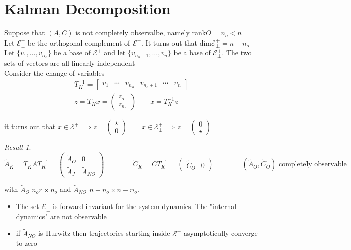 \documentclass{book}
\theoremstyle{definition}
\theoremstyle{remark}
\theoremstyle{remark}
\newtheorem*{result}{Result}
\begin{document}
\section{Kalman Decomposition}

Suppose that $(A,C)$ is not completely observalbe, namely rank$O=n_o<n$\\
Let $\mathcal{E}^+_{\perp}$ be the orthogonal complement of $\mathcal{E}^+$. It turns out that dim$\mathcal{E}^+_{\perp}=n-n_o$ \\
Let $\{v_1,\dots,v_{n_o}\}$ be a base of $\mathcal{E}^+$ and let $\{v_{n_o+1},\dots,v_n\}$ be a base of $\mathcal{E}^+_{\perp}$. The two sets of vectors are all linearly independent\\
Consider the change of variables \begin{gather*}
    T_K^{-1}=\begin{bmatrix}
    v_1 &  \cdots & v_{n_o} & v_{n_o+1} & \cdots & v_n
\end{bmatrix}\\
z=T_Kx=\begin{pmatrix}
    z_o \\ z_{n_o}
\end{pmatrix} \qquad x=T_K^{-1}z
\end{gather*}

it turns out that $x\in \mathcal{E}^+ \implies z= \begin{pmatrix}
    \star \\ 0
\end{pmatrix} \qquad x\in\mathcal{E}^+_{\perp} \implies z= \begin{pmatrix}
    0 \\ \star
\end{pmatrix}$ 
\begin{result}
\[
    \tilde{A}_K=T_KAT_K^{-1}=\begin{pmatrix}
        \tilde{A}_O & 0\\
        \tilde{A}_J & \tilde{A}_{NO}
    \end{pmatrix} \qquad \qquad \tilde{C}_K=CT_K^{-1}=\begin{pmatrix}
        \tilde{C}_O & 0
    \end{pmatrix} \qquad \qquad (\tilde{A}_O,\tilde{C}_O) \text{ completely observable}
\]
\end{result}
with  $\tilde{A}_O$ $n_or\times n_o$ and $\tilde{A}_{NO}$ $n-n_o \times n-n_o$.\\
\begin{itemize}
    \item The set $\mathcal{E}^+_{\perp}$ is forward invariant for the system dynamics. The "internal dynamics" are not observable
    \item if $\tilde{A}_{NO}$ is Hurwitz then trajectories starting inside $\mathcal{E}^+_{\perp}$ asymptotically converge to zero
\end{itemize}
\end{document}
